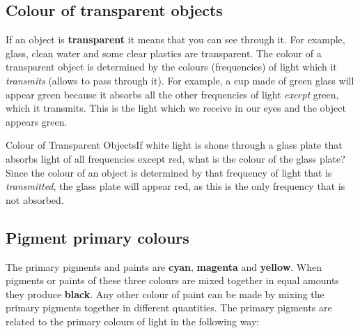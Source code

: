 \subsection{Colour of transparent objects}
If an object is \textbf{transparent} it means that you can see through it. For example, glass, clean water and some clear plastics are transparent. The colour of a transparent object is determined by the colours (frequencies) of light which it \textit{transmits} (allows to pass through it). For example, a cup made of green glass will appear green because it absorbs all the other frequencies of light \textit{except} green, which it transmits. This is the light which we receive in our eyes and the object appears green. 

\vspace{-0.5cm}

\begin{wex}
{Colour of Transparent Objects}{If white light is shone through a glass plate that absorbs light of all frequencies except red, what is the colour of the glass plate?\vspace{-0.1cm}}
{Since the colour of an object is determined by that frequency of light that is \textit{transmitted}, the glass plate will appear red, as this is the only frequency that is not absorbed.}
\end{wex}

\clearpage

\subsection{Pigment primary colours}
The primary pigments and paints are \textbf{cyan}, \textbf{magenta} and \textbf{yellow}. When pigments or paints of these three colours are mixed together in equal amounts they produce \textbf{black}. Any other colour of paint can be made by mixing the primary pigments together in different quantities. The primary pigments are related to the primary colours of light in the following way:

